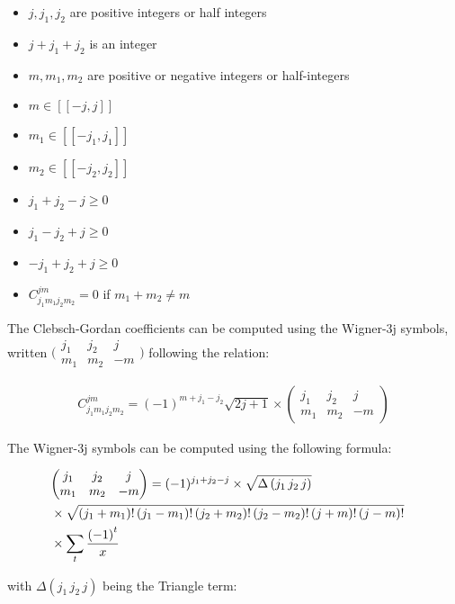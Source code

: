 \documentclass[12pt]{article}
\begin{document}
\begin{itemize} 
\item $j,j_1,j_2$ are positive integers or half integers
\item $j+j_1+j_2$ is an integer
\item $m,m_1,m_2$ are positive or negative integers or half-integers
\item $m \in [\![-j,j]\!]$
\item $m_1 \in [\![-j_1,j_1]\!]$
\item $m_2 \in [\![-j_2,j_2]\!]$
\item $j_1+j_2-j \ge 0$
\item $j_1-j_2+j \ge 0$
\item $-j_1+j_2+j \ge 0$
\item $C^{j m}_{j_1 m_1 j_2 m_2}=0$ if $m_1+m_2 \not= m$ \\
\end{itemize}

The Clebsch-Gordan coefficients can be computed using the Wigner-3j symbols, written $\bigl( \begin{smallmatrix} j_1 & j_2 & j \\ m_1 & m_2 & -m \end{smallmatrix} \bigr)$ following the relation:

\begin{eqnarray}
C^{j m}_{j_1 m_1 j_2 m_2}=\left(-1\right)^{m+j_1-j_2} \sqrt{2 j+1} \times \begin{pmatrix} j_1 & j_2 & j \\ m_1 & m_2 & -m \end{pmatrix}
\end{eqnarray}

The Wigner-3j symbols can be computed using the following formula:

\begin{eqnarray}
\lefteqn{ \begin{pmatrix} j_1 & j_2 & j \\ m_1 & m_2 & -m \end{pmatrix}  = (-1)^{j_1+j_2-j} \times \sqrt{\Delta\left(j_1\, j_2\, j\right)} } \\ 
& \times \sqrt{\left(j_1+m_1\right)! \left(j_1-m_1\right)! \left(j_2+m_2\right)! \left(j_2-m_2\right)! \left(j+m\right)! \left(j-m\right)!} \nonumber \\
& \times \sum_{t} \frac{\left(-1\right)^t}{x} \nonumber
\end{eqnarray}

with $\Delta\left(j_1\, j_2\, j\right)$ being the Triangle term:
\end{document}
